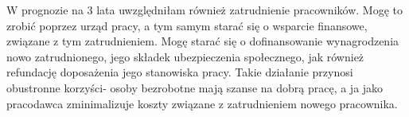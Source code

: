 				
				\par W prognozie na 3 lata uwzględniłam również zatrudnienie pracowników. Mogę to zrobić poprzez urząd pracy, a tym samym starać się o wsparcie finansowe, związane z tym zatrudnieniem. Mogę starać się o dofinansowanie wynagrodzenia nowo zatrudnionego, jego składek ubezpieczenia społecznego, jak również refundację doposażenia jego stanowiska pracy. Takie działanie przynosi obustronne korzyści- osoby bezrobotne mają szanse na dobrą pracę, a ja jako pracodawca zminimalizuje koszty związane z zatrudnieniem nowego pracownika.	
